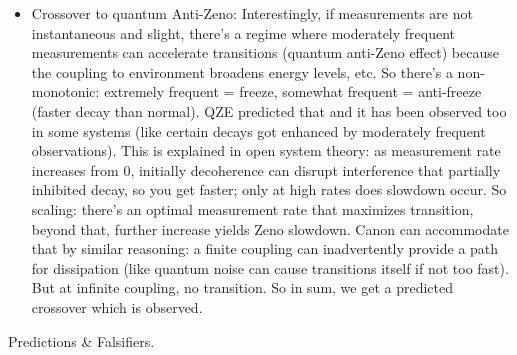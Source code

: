 \documentclass[11pt]{article}
\begin{document}
\begin{itemize}
\item 
Crossover to quantum Anti-Zeno: Interestingly, if measurements are not instantaneous and slight, there's a regime where moderately frequent measurements can accelerate transitions (quantum anti-Zeno effect) because the coupling to environment broadens energy levels, etc. So there's a non-monotonic: extremely frequent = freeze, somewhat frequent = anti-freeze (faster decay than normal). QZE predicted that and it has been observed too in some systems (like certain decays got enhanced by moderately frequent observations). This is explained in open system theory: as measurement rate increases from 0, initially decoherence can disrupt interference that partially inhibited decay, so you get faster; only at high rates does slowdown occur. So scaling: there's an optimal measurement rate that maximizes transition, beyond that, further increase yields Zeno slowdown. Canon can accommodate that by similar reasoning: a finite coupling can inadvertently provide a path for dissipation (like quantum noise can cause transitions itself if not too fast). But at infinite coupling, no transition. So in sum, we get a predicted crossover which is observed.




\end{itemize}

Predictions & Falsifiers.
\end{document}
